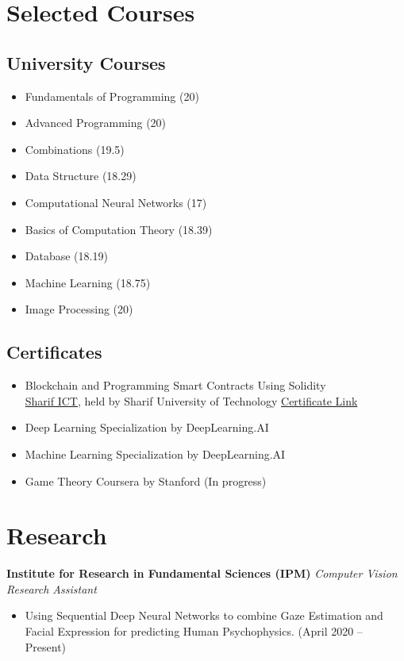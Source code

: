 \documentclass[a4paper,10pt]{article}
\begin{document}
\section*{Selected Courses}
\subsection*{University Courses}
\begin{itemize}
  \item Fundamentals of Programming (20)
  \item Advanced Programming (20)
  \item Combinations (19.5)
  \item Data Structure (18.29)
  \item Computational Neural Networks (17)
  \item Basics of Computation Theory (18.39)
  \item Database (18.19)
  \item Machine Learning (18.75)
  \item Image Processing (20)
\end{itemize}

\subsection*{Certificates}
\begin{itemize}
  \item Blockchain and Programming Smart Contracts Using Solidity \\
    \href{https://sharifict.ir/}{Sharif ICT}, held by Sharif University of Technology \quad \href{https://ibb.co/R2Zf8kk}{Certificate Link}
  \item Deep Learning Specialization by DeepLearning.AI  \\
    
  \item Machine Learning Specialization by DeepLearning.AI \\

  \item Game Theory Coursera by Stanford (In progress)
 
\end{itemize}

\section*{Research}
\textbf{Institute for Research in Fundamental Sciences (IPM)} \hfill \textit{Computer Vision Research Assistant}
\begin{itemize}
  \item  Using Sequential Deep Neural Networks to combine Gaze Estimation and Facial Expression for predicting Human Psychophysics. (April 2020 -- Present)

\end{itemize}
\end{document}
